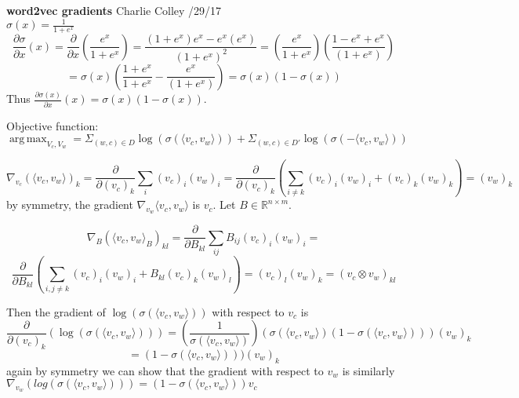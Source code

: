 \documentclass{report}
\DeclareMathOperator*{\argmax}{arg\,max}
\begin{document}
   \textbf{word2vec gradients} \quad Charlie Colley /29/17\\
   
   
   
   $ \sigma(x) = \frac{1}{1 + e^{x}} $
   \[\frac{\partial \sigma}{\partial x}(x) 
     =  \frac{\partial}{\partial x}(\frac{e^x}{1+e^x}) 
     =  \frac{(1 + e^x)e^x - e^x(e^x)}{(1 + e^x)^2} 
     = (\frac{e^x}{1+ e^x})(\frac{1 - e^x + e^x}{(1 + e^x)}) \]
     \[
     = \sigma(x)(\frac{1+e^x}{1+e^x} -\frac{e^x}{(1+e^x)})
     = \sigma(x)(1 - \sigma(x))
   \]
   Thus  $\frac{\partial \sigma(x)}{\partial x}(x) =
           \sigma(x)(1 - \sigma(x))$.
           
\vspace{10 mm}
   Objective function:\\
   $ \displaystyle\argmax_{V_c, V_w} 
     = \displaystyle\Sigma_{(w,c) \in D} \log(\sigma(\langle v_c, v_w \rangle )) +      \displaystyle\Sigma_{(w,c) \in D'} \log(\sigma(-\langle v_c, v_w \rangle)) $ 

   \[
      \nabla_{v_c} (\langle v_c, v_w \rangle)_k = \frac{\partial}{\partial (v_c)_k}\displaystyle \sum_{i}(v_c)_i(v_w)_i = \frac{\partial}{\partial (v_c)_k}(\displaystyle \sum_{i \neq k}(v_c)_i(v_w)_i + (v_c)_k(v_w)_k) = (v_w)_k
   \]
   by symmetry, the gradient $\nabla_{v_w} \langle v_c, v_w \rangle $ is $ v_c $.
   Let $ B \in \mathbb{R}^{n \times m}$.
     
    \[ \nabla_{B} (\langle v_c, v_w \rangle_{B})_{kl} = \frac{\partial}{\partial B_{kl}}\displaystyle \sum_{ij}B_{ij}(v_c)_i(v_w)_i = \]
    \[\frac{\partial}{\partial B_{kl}}(\displaystyle \sum_{i,j \neq k}(v_c)_i(v_w)_i + B_{kl}(v_c)_k(v_w)_l) = (v_c)_l(v_w)_k = (v_c \otimes v_w)_{kl}\]
    
    Then the gradient of $ \log(\sigma(\langle v_c, v_w \rangle )) $ with respect to $ v_c $ is 
    \[
      \frac{\partial}{\partial (v_c)_k}(\log(\sigma(\langle v_c, v_w \rangle)))
      = (\frac{1}{\sigma(\langle v_c, v_w \rangle)})(\sigma(\langle v_c, v_w \rangle)(1 - \sigma(\langle v_c, v_w \rangle)))(v_w)_k 
    \]
    \[
      = (1 - \sigma(\langle v_c, v_w \rangle)))(v_w)_k 
    \]
    again by symmetry we can show that the gradient with respect to $ v_w $ is similarly $ \nabla_{v_w}(log(\sigma(\langle v_c, v_w \rangle))) = (1 - \sigma(\langle v_c, v_w \rangle))v_c $
\end{document}
